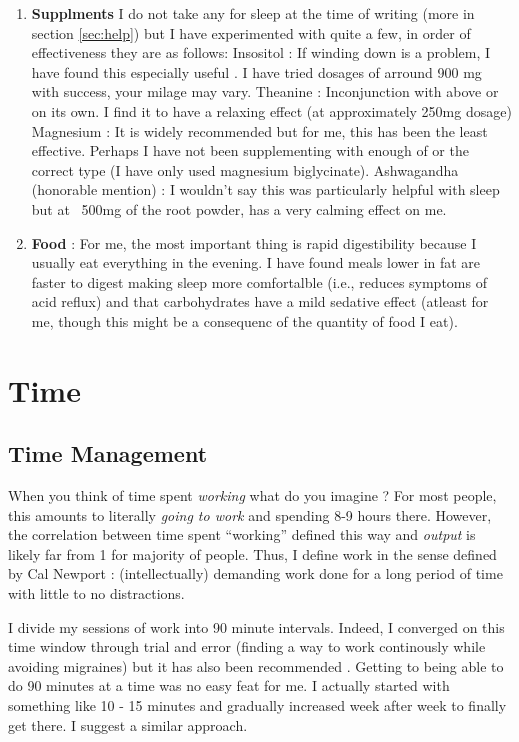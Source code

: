 \documentclass[10pt,twocolumn]{extarticle}
\begin{document}
\begin{enumerate}
    \item{\textbf{Supplments}} I do not take any for sleep at the time of writing (more in section \ref{sec:help}) but I have experimented with quite a few, in order of effectiveness they are as follows:
    \subitem Insositol : If winding down is a problem, I have found this especially useful \cite{youtube_supplementation_health}. I have tried dosages of arround 900 mg with success, your milage may vary.
    \subitem Theanine : Inconjunction with above or on its own. I find it to have a relaxing effect (at approximately 250mg dosage)
    \subitem Magnesium : It is widely recommended but for me, this has been the least effective. Perhaps I have not been supplementing with enough of or the correct type (I have only used magnesium biglycinate). 
    \subitem Ashwagandha (honorable mention) : I wouldn't say this was particularly helpful with sleep but at ~500mg of the root powder, has a very calming effect on me.
    \item{\textbf{Food}} : For me, the most important thing is rapid digestibility because I usually eat everything in the evening. I have found meals lower in fat are faster to digest  making sleep more comfortalble (i.e., reduces symptoms of acid reflux) and that carbohydrates have a mild sedative effect (atleast for me, though this might be a consequenc of the quantity of food I eat). 
\end{enumerate}



\section{Time}
\label{sec:productive_pracs}


\subsection{Time Management}

When you think of time spent \textit{working} what do you imagine ? For most people, this amounts to literally \textit{going to work} and spending 8-9 hours there. However, the correlation between time spent ``working'' defined this way and \textit{output} is likely far from 1 for majority of people. Thus, I define work in the sense defined by Cal Newport \cite{youtube_deep_work} : (intellectually) demanding work done for a long period of time with little to no distractions.

I divide my sessions of work into 90 minute intervals. Indeed, I converged on this time window through trial and error (finding a way to work continously while avoiding migraines) but it has also been recommended \cite{youtube_huberman_focused_work}. Getting to being able to do 90 minutes at a time was no easy feat for me. I actually started with something like 10 - 15 minutes and gradually increased week after week to finally get there. I suggest a similar approach.
\end{document}
